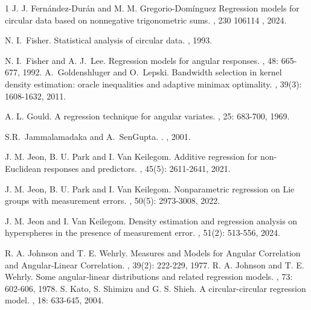 \documentclass[11pt,a4paper,openany]{article}
\begin{document}
\begin{thebibliography}{1}
J. J. Fern\' andez-Dur\' an and M. M. Gregorio-Dom\'inguez
\newblock Regression models for circular data based on nonnegative trigonometric sums.
, 230 106114 , 2024.

N. I.~Fisher.
\newblock Statistical analysis of circular data.
, 1993.

N. I.~Fisher and A. J.~Lee.
\newblock Regression models for angular responses.
, 48: 665-677, 1992.
A.~Goldenshluger and O.~Lepski.
\newblock Bandwidth selection in kernel density estimation: oracle inequalities and adaptive minimax optimality.
, 39(3): 1608-1632, 2011.


A. L. Gould. 
\newblock A regression technique for angular variates.
, 25: 683-700, 1969.

S.R.~Jammalamadaka and A.~SenGupta. 
.
, 2001.


J. M. Jeon, B. U. Park and I. Van Keilegom. 
\newblock Additive regression for non-Euclidean responses and predictors.
, 45(5): 2611-2641, 2021.


J. M. Jeon, B. U. Park and I. Van Keilegom. 
\newblock Nonparametric regression on Lie groups with measurement errors.
, 50(5): 2973-3008, 2022.


J. M. Jeon and I. Van Keilegom. 
\newblock Density estimation and regression analysis on hyperspheres in the presence of measurement error.
, 51(2): 513-556, 2024.


R. A. Johnson and T. E. Wehrly.
\newblock Measures and Models for Angular Correlation and Angular-Linear Correlation.
, 39(2): 222-229, 1977.
R. A. Johnson and T. E. Wehrly.
\newblock Some angular-linear distributions and related regression models. 
, 73: 602-606, 1978.
S. Kato, S. Shimizu and G. S. Shieh.  
\newblock A circular-circular regression model. 
, 18: 633-645, 2004.


\end{thebibliography}
\end{document}
